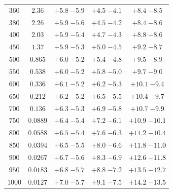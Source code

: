 \begin{table}
\begin{center}
\begin{tabular}{ccccc}
$ 360  $&$  2.36 $& $ {+ 5.8}  \;{- 5.9} $ & $ {+ 4.5}  \;{- 4.1} $ & $ {+ 8.4}  \;{- 8.5} $ \\
$ 380  $&$  2.26 $& $ {+ 5.9}  \;{- 5.6} $ & $ {+ 4.5}  \;{- 4.2} $ & $ {+ 8.4}  \;{- 8.6} $ \\
$ 400  $&$  2.03 $& $ {+ 5.9}  \;{- 5.4} $ & $ {+ 4.7}  \;{- 4.3} $ & $ {+ 8.8}  \;{- 8.6} $ \\
$ 450  $&$  1.37 $& $ {+ 5.9}  \;{- 5.3} $ & $ {+ 5.0}  \;{- 4.5} $ & $ {+ 9.2}  \;{- 8.7} $ \\
$ 500  $&$  0.865 $& $ {+ 6.0}  \;{- 5.2} $ & $ {+ 5.4}  \;{- 4.8} $ & $ {+ 9.5}  \;{- 8.9} $ \\
$ 550  $&$  0.538 $& $ {+ 6.0}  \;{- 5.2} $ & $ {+ 5.8}  \;{- 5.0} $ & $ {+ 9.7}  \;{- 9.0} $ \\
$ 600  $&$  0.336 $& $ {+ 6.1}  \;{- 5.2} $ & $ {+ 6.2}  \;{- 5.3} $ & $ {+10.1}  \;{- 9.4} $ \\
$ 650  $&$  0.212 $& $ {+ 6.2}  \;{- 5.2} $ & $ {+ 6.5}  \;{- 5.5} $ & $ {+10.4}  \;{- 9.7} $ \\
$ 700  $&$  0.136 $& $ {+ 6.3}  \;{- 5.3} $ & $ {+ 6.9}  \;{- 5.8} $ & $ {+10.7}  \;{- 9.9} $ \\
$ 750  $&$  0.0889 $& $ {+ 6.4}  \;{- 5.4} $ & $ {+ 7.2}  \;{- 6.1} $ & $ {+10.9}  \;{-10.1} $ \\
$ 800  $&$  0.0588 $& $ {+ 6.5}  \;{- 5.4} $ & $ {+ 7.6}  \;{- 6.3} $ & $ {+11.2}  \;{-10.4} $ \\
$ 850  $&$  0.0394 $& $ {+ 6.5}  \;{- 5.5} $ & $ {+ 8.0}  \;{- 6.6} $ & $ {+11.8}  \;{-11.0} $ \\
$ 900  $&$  0.0267 $& $ {+ 6.7}  \;{- 5.6} $ & $ {+ 8.3}  \;{- 6.9} $ & $ {+12.6}  \;{-11.8} $ \\
$ 950  $&$  0.0183 $& $ {+ 6.8}  \;{- 5.7} $ & $ {+ 8.8}  \;{- 7.2} $ & $ {+13.5}  \;{-12.7} $ \\
$1000  $&$  0.0127 $& $ {+ 7.0}  \;{- 5.7} $ & $ {+ 9.1}  \;{- 7.5} $ & $ {+14.2}  \;{-13.5} $ \\


\hline
\end{tabular}
\end{center}
\end{table}



